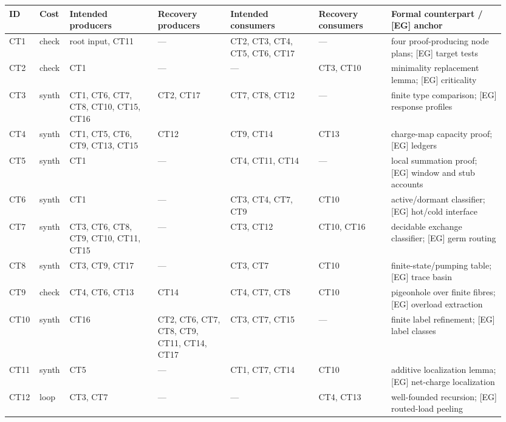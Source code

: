 \documentclass[
  11pt,
]{article}
\theoremstyle{definition}
\begin{document}
\begingroup
\tiny
\setlength{\tabcolsep}{0.7pt}
\begin{longtable}[]{@{}
  >{\raggedright\arraybackslash}p{0.055\linewidth}
  >{\raggedright\arraybackslash}p{0.055\linewidth}
  >{\raggedright\arraybackslash}p{0.17\linewidth}
  >{\raggedright\arraybackslash}p{0.14\linewidth}
  >{\raggedright\arraybackslash}p{0.17\linewidth}
  >{\raggedright\arraybackslash}p{0.14\linewidth}
  >{\raggedright\arraybackslash}p{0.22\linewidth}@{}}
\toprule\noalign{}
ID & Cost & Intended producers & Recovery producers & Intended consumers & Recovery consumers & Formal counterpart / [EG] anchor \\
\midrule\noalign{}
\endhead
\bottomrule\noalign{}
\endlastfoot
CT1 & check & root input, CT11 & --- & CT2, CT3, CT4, CT5, CT6, CT17 & --- & four proof-producing node plans; [EG] target tests \\
CT2 & check & CT1 & --- & --- & CT3, CT10 & minimality replacement lemma; [EG] criticality \\
CT3 & synth & CT1, CT6, CT7, CT8, CT10, CT15, CT16 & CT2, CT17 & CT7, CT8, CT12 & --- & finite type comparison; [EG] response profiles \\
CT4 & synth & CT1, CT5, CT6, CT9, CT13, CT15 & CT12 & CT9, CT14 & CT13 & charge-map capacity proof; [EG] ledgers \\
CT5 & synth & CT1 & --- & CT4, CT11, CT14 & --- & local summation proof; [EG] window and stub accounts \\
CT6 & synth & CT1 & --- & CT3, CT4, CT7, CT9 & CT10 & active/dormant classifier; [EG] hot/cold interface \\
CT7 & synth & CT3, CT6, CT8, CT9, CT10, CT11, CT15 & --- & CT3, CT12 & CT10, CT16 & decidable exchange classifier; [EG] germ routing \\
CT8 & synth & CT3, CT9, CT17 & --- & CT3, CT7 & CT10 & finite-state/pumping table; [EG] trace basin \\
CT9 & check & CT4, CT6, CT13 & CT14 & CT4, CT7, CT8 & CT10 & pigeonhole over finite fibres; [EG] overload extraction \\
CT10 & synth & CT16 & CT2, CT6, CT7, CT8, CT9, CT11, CT14, CT17 & CT3, CT7, CT15 & --- & finite label refinement; [EG] label classes \\
CT11 & synth & CT5 & --- & CT1, CT7, CT14 & CT10 & additive localization lemma; [EG] net-charge localization \\
CT12 & loop & CT3, CT7 & --- & --- & CT4, CT13 & well-founded recursion; [EG] routed-load peeling \\

\end{longtable}
\end{document}
